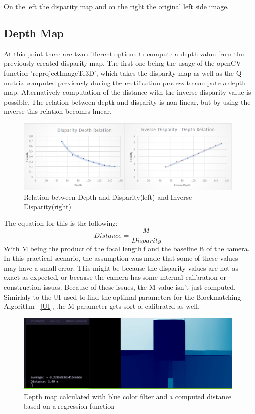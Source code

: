 \documentclass[journal,onecolumn]{IEEEtran}
\begin{document}
\noindent On the left the disparity map and on the right the original left side image.

\subsection{Depth Map}
\noindent
\noindent At this point there are two different options to compute a depth value from the previously created disparity map. The first one being the usage of the openCV function 'reprojectImageTo3D', which takes the disparity map as well as the Q matrix computed  previously during the rectification process to compute a depth map.
Alternatively computation of the distance with the inverse disparity-value is possible. The relation between depth and disparity is non-linear, but by using the inverse this relation becomes linear. 
\begin{figure}[H]
	\centering
	\includegraphics[scale=0.5]{ratios.png}
	\captionsetup{justification=centering}
	\caption{Relation between Depth and Disparity(left) and Inverse Disparity(right)}
\end{figure}
\noindent The equation for this is the following: 
\begin{equation}
	Distance = \frac{M}{Disparity}
\end{equation}
\noindent With M being the product of the focal length f and the baseline B of the camera. \newline
In this practical scenario, the assumption was made that some of these values may have a small error. This might be because the disparity values are not as exact as expected, or because the camera has some internal calibration or construction issues. Because of these issues, the  M value isn't just computed. Simirlaly to the UI used to find the optimal parameters for the Blockmatching Algorithm ~\ref{UI}, the M parameter gets sort of calibrated as well. 

\begin{figure}[H]
	\centering
	\includegraphics[scale=0.5]{distanceCalcRegression.png}
	\captionsetup{justification=centering}
	\caption{Depth map calculated with blue color filter and a computed distance based on a regression function}
\end{figure}
\end{document}
